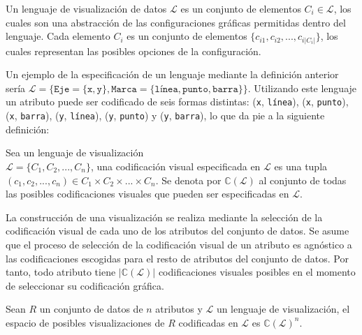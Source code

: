 \begin{definition}
    Un lenguaje de visualizaci\'on de datos $\mathcal{L}$ es un
    conjunto de elementos $C_i \in \mathcal{L}$, los cuales son una
    abstracci\'on de las configuraciones gr\'aficas permitidas dentro
    del lenguaje. Cada elemento $C_i$ es un conjunto de elementos
    $\{ c_{i1}, c_{i2},..., c_{i|C_i|}\}$, los cuales representan las
    posibles opciones de la configuraci\'on.
\end{definition}

Un ejemplo de la especificaci\'on de un lenguaje mediante la definici\'on anterior
ser\'ia $\mathcal{L} = \{ \texttt{Eje} = \{ \texttt{x}, \texttt{y} \}, 
\texttt{Marca} = \{ \texttt{l\'inea}, \texttt{punto}, \texttt{barra} \} \}$. 
Utilizando
este lenguaje un atributo puede ser codificado de seis formas distintas:
(\texttt{x}, \texttt{l\'inea}), (\texttt{x}, \texttt{punto}), \\(\texttt{x}, \texttt{barra}), (\texttt{y}, \texttt{l\'inea}),
(\texttt{y}, \texttt{punto}) y (\texttt{y}, \texttt{barra}), lo que da pie a la siguiente definici\'on:

\begin{definition}
    Sea un lenguaje de visualizaci\'on \\ $\mathcal{L} = \{ C_1, C_2, ..., C_n \}$,
    una codificaci\'on visual especificada en $\mathcal{L}$ es una tupla\\ $(c_1,c_2,...,c_n) \in C_1 \times C_2 \times ... \times C_n$.
    Se denota por $\mathbb{C}(\mathcal{L})$ al conjunto de todas las posibles codificaciones visuales
    que pueden ser especificadas en $\mathcal{L}$.
\end{definition}

La construcci\'on de una visualizaci\'on se realiza mediante
la selecci\'on de la codificaci\'on visual de cada uno de los atributos
del conjunto de datos. Se asume que el proceso de selecci\'on de la codificaci\'on visual de un
atributo es agn\'ostico a las codificaciones escogidas
para el resto de atributos del conjunto de datos. Por tanto,
todo atributo tiene  $|\mathbb{C}(\mathcal{L})|$ codificaciones
visuales posibles en el momento de seleccionar su codificaci\'on gr\'afica.

\begin{definition}
    Sean $R$ un conjunto de datos de $n$ atributos y $\mathcal{L}$ un lenguaje de visualizaci\'on, el espacio
    de posibles visualizaciones de $R$ codificadas en $\mathcal{L}$ es $\mathbb{C}(\mathcal{L})^n$.
    
\end{definition}

